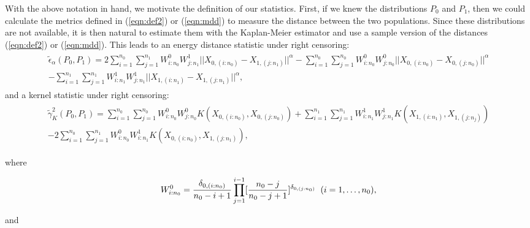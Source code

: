 \documentclass[11pt]{article}
\begin{document}
With the above notation  in hand, we motivate  the   definition  of our statistics. First,  if we knew the distributions $P_0$ and $P_1$, then we could  calculate the metrics defined in (\ref{eqn:def2})  or (\ref{eqn:mdd})  to measure  the  distance  between the two populations. Since these distributions are not available, it is then natural to  estimate   them with the Kaplan-Meier estimator and use a  sample version  of the distances    (\ref{eqn:def2})  or (\ref{eqn:mdd}). This leads to 
an   energy distance statistic under right censoring:
\begin{gather}\label{sin normalizarr}
\begin{align}
\tilde{\epsilon}_{\alpha}(P_0,P_1)= 2\sum_{i=1}^{n_0}  \sum_{j=1}^{n_1} W^{0}_{i:n_0} W^{1}_{j:n_1} ||X_{0,(i:n_0)}-X_{1,(j:n_1)}||^{\alpha} - \sum_{i=1}^{n_0} \sum_{j=1}^{n_0}  W^{0}_{i:n_0} W^{0}_{j:n_0}  ||X_{0,(i:n_0)}-X_{0,(j:n_0)}||^{\alpha} \\ - \sum_{i=1}^{n_1}  \sum_{j=1}^{n_1} W^{1}_{i:n_1} W^{1}_{j:n_1} ||X_{1,(i:n_1)}-X_{1,(j:n_1)}||^{\alpha} \nonumber,
\end{align}
\end{gather}
and a kernel  statistic under right censoring:
\begin{gather}
\begin{align}
\tilde{\gamma}_K^{2}(P_0,P_1)=  \sum_{i=1}^{n_0}  \sum_{j=1}^{n_0} W^{0}_{i:n_0} W^{0}_{j:n_0} K(X_{0,(i:n_0)},X_{0,(j:n_0)})+ \sum_{i=1}^{n_1}  \sum_{j=1 }^{n_1} W^{1}_{i:n_1} W^{1}_{j:n_1} K(X_{1,(i:n_1)},X_{1,(j:n_j)})\\-2\sum_{i=1}^{n_0}  \sum_{j=1}^{n_1} W^{0}_{i:n_0} W^{1}_{i:n_1} K(X_{0,(i:n_0)},X_{1,(j:n_1)}),\nonumber
\end{align}
\end{gather}

where

\begin{equation}
W^{0}_{{i:n_0}}= \frac{\delta_{0,(i:n_0)}}{n_0-i+1}\prod_{j=1}^{i-1}[\frac{n_0-j}{n_0-j+1}]^{\delta_{0,(j:n_0)}}
\hspace{0.2cm}   (i=1,\dots,n_0),
\end{equation}

and
\end{document}
